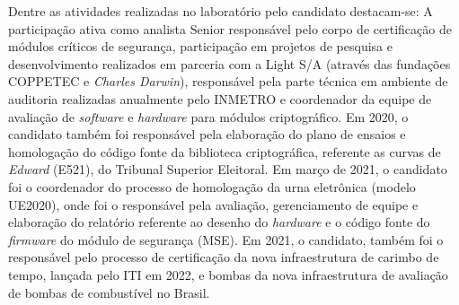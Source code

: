Dentre as atividades realizadas no laboratório pelo candidato destacam-se: A participação ativa como 
analista Senior responsável pelo corpo de certificação de módulos críticos de segurança, participação 
em projetos de pesquisa e desenvolvimento realizados em parceria com a Light S/A (através das fundações 
COPPETEC e \emph{Charles Darwin}), responsável pela parte técnica em ambiente de auditoria realizadas anualmente 
pelo INMETRO e coordenador da equipe de avaliação de \emph{software} e \emph{hardware} para módulos criptográfico. 
Em 2020, o candidato também foi responsável pela elaboração do plano de ensaios e homologação 
do código fonte da biblioteca criptográfica, referente as curvas de \emph{Edward} (E521), do Tribunal Superior 
Eleitoral. Em março de 2021, o candidato foi o coordenador do processo de homologação da urna 
eletrônica (modelo UE2020), onde foi o responsável pela avaliação, gerenciamento de equipe e elaboração do relatório referente 
ao desenho do \emph{hardware} e o código fonte do \emph{firmware} do módulo de segurança (MSE). Em 2021, o 
candidato, também foi o responsável pelo processo de certificação da nova infraestrutura 
de carimbo de tempo, lançada pelo ITI em 2022, e bombas da nova infraestrutura de avaliação de bombas de 
combustível no Brasil.







